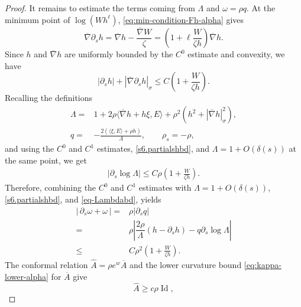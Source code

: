 \documentclass[10pt,a4paper]{amsart}
\newcommand{\Id}{\operatorname{Id}}
\begin{document}
\begin{proof}
It remains to estimate the terms coming from $\Lambda$ and $\omega=\rho q$.
At the minimum point of $\log(Wh^\ell)$, \eqref{eq:min-condition-Fh-alpha} gives
\begin{equation*}
        \overline{\nabla} \partial_s h
        =\overline{\nabla} h-\frac{\overline{\nabla} W}{\zeta}
        =\left(1+\ell\frac{W}{\zeta h}\right)\overline{\nabla} h.
\end{equation*}
Since $h$ and $\overline{\nabla} h$ are uniformly bounded by the $C^0$ estimate and convexity, we have
\begin{equation}
    |\partial_s h|+|\overline{\nabla}\partial_s h|_{\sigma}\leq C\left( 1+\dfrac{W}{\zeta h} \right).
    \label{s6.partialshbd}
\end{equation}
Recalling the definitions
\begin{align*}
        \Lambda=&1+2\rho \langle \overline{\nabla}h+h\xi,E \rangle+\rho^2(h^2+|\overline{\nabla}h|_{\sigma}^2), \\
        q=&-\frac{2(\langle \xi,E \rangle+\rho h)}{\Lambda},\qquad \rho_s=-\rho,
\end{align*}
and using the $C^0$ and $C^1$ estimates, \eqref{s6.partialshbd}, and $\Lambda=1+O(\delta(s))$ at the same point, we get
\begin{align}
    |\partial_s\log \Lambda| %
    \le C\rho\left(1+\frac{W}{\zeta h}\right).  \label{eq-Lambdabd}
\end{align}
Therefore, combining the $C^0$ and $C^1$ estimates with $\Lambda=1+O(\delta(s))$, \eqref{s6.partialshbd}, and \eqref{eq-Lambdabd}, yields
\begin{align*}
        |\,\partial_s\omega+\omega\,|
        =&\rho|\partial_s q|\\
        =&  \rho\left| \dfrac{2\rho}{\Lambda}(h-\partial_s h)-q\partial_s\log\Lambda \right|\\
        \le & C \rho^2 \left(1+\frac{W}{\zeta h}\right).
\end{align*}
The conformal relation $\widehat A=\rho e^w\overline A$ and the lower curvature bound \eqref{eq:kappa-lower-alpha} for $\overline{A}$ give
\begin{equation*}
        \widehat A\ge c\rho\Id , 

\end{equation*}
\end{proof}
\end{document}
